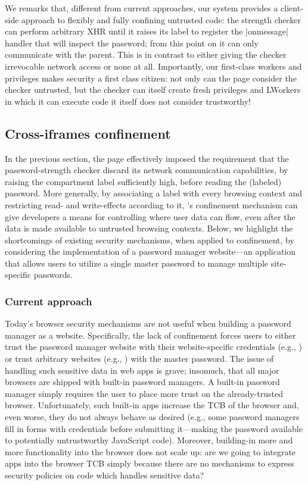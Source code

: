 We remarks that, different from current approaches, our system
provides a client-side approach to flexibly and fully confining
untrusted code:
%
the strength checker can perform arbitrary XHR until it raises its
label to register the \js|onmessage| handler that will inspect the
password; from this point on it can only communicate with the parent.
%
This is in contrast to either giving the checker irrevocable network
access or none at all.
%
Importantly, our first-class workers and privileges makes security a
first class citizen: not only can the page consider the checker
untrusted, but the checker can itself create fresh privileges and 
LWorkers in which it can execute code it itself does not consider
trustworthy!

\subsection{Cross-iframes confinement}
\label{sec:system:iframe}

In the previous section, the  page effectively
imposed the requirement that the password-strength checker discard its
network communication capabilities, by raising the compartment label
sufficiently high, before reading the (labeled) password.
%
More generally, by associating a label with every browsing context and
restricting read- and write-effects according to it, \sys{}'s
confinement mechanism can give developers a means for controlling
where user data can flow, even after the data is made available to
untrusted browsing contexts.
%
Below, we highlight the shortcomings of existing security mechanisms,
when applied to confinement, by considering the implementation of a
password manager website---an application that allows users to utilize
a single master password to manage multiple site-specific passwords.

\subsubsection{Current approach}
%
Today's browser security mechanisms are not useful when building a
password manager as a website.
%
Specifically, the lack of confinement forces users to either trust the
password manager website with their website-specific  credentials
(e.g., ) or trust arbitrary websites (e.g.,
) with the master password.
%
The issue of handling such sensitive data in web apps is grave;
insomuch, that all major browsers are shipped with built-in password
managers.
%
A built-in password manager simply requires the user to place more
trust on the already-trusted browser.
%
Unfortunately, such built-in apps increase the TCB of the browser and, even
worse, they do not always behave as desired (e.g., some password managers fill in
forms with credentials before submitting it---making the
password available to potentially untrustworthy JavaScript code).
%
Moreover, building-in more and more functionality into the browser does not
scale up: are we going to integrate apps into the browser TCB simply because
there are no mechanisms 
to express security policies on code which handles sensitive data?

